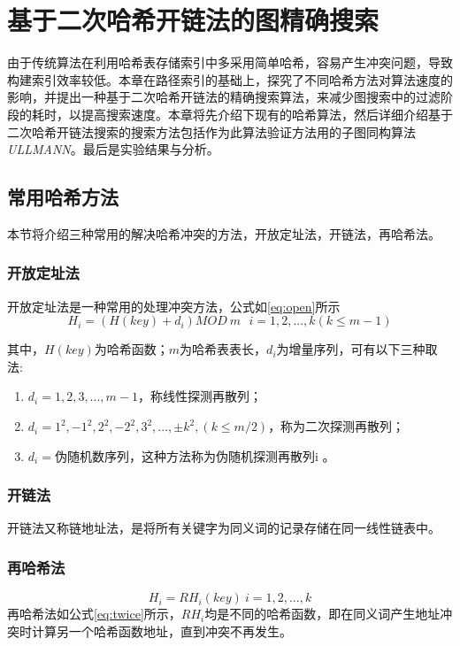 \documentclass{XDBAthesis}
\numberwithin{algorithm}{chapter}
\begin{document}
\else
\fi
\chapter{基于二次哈希开链法的图精确搜索}
\label{chap:graphgrep}
由于传统算法在利用哈希表存储索引中多采用简单哈希，容易产生冲突问题，导致构建索引效率较低。本章在路径索引的基础上，探究了不同哈希方法对算法速度的影响，并提出一种基于二次哈希开链法的精确搜索算法，来减少图搜索中的过滤阶段的耗时，以提高搜索速度。本章将先介绍下现有的哈希算法，然后详细介绍基于二次哈希开链法搜索的搜索方法包括作为此算法验证方法用的子图同构算法\emph{ULLMANN}\cite{ullmann}。最后是实验结果与分析。

\section{常用哈希方法}
本节将介绍三种常用的解决哈希冲突的方法，开放定址法，开链法，再哈希法。

\subsection{开放定址法}
开放定址法\cite{datastruct}是一种常用的处理冲突方法，公式如\eqref{eq:open}所示
\begin{equation}
    H_i =(H(key)+d_i )MOD\ m\ \  \ i=1,2,...,k(k\leq m-1)
    \label{eq:open}
\end{equation}

其中，$H(key)$为哈希函数；$m$为哈希表表长，$d_i $为增量序列，可有以下三种取法:
\begin{enumerate}
    \item $d_i =1,2,3,...,m-1$，称线性探测再散列；
    \item $d_i =1^2 ,-1^2 ,2^2 ,-2^2 ,3^2 ,...,\pm k^2 ,(k\leq m/2 ) $，称为二次探测再散列；
    \item $d_i =$伪随机数序列，这种方法称为伪随机探测再散列\cite{datastruct}i 。
\end{enumerate}
\subsection{开链法}
开链法又称链地址法\cite{datastruct}，是将所有关键字为同义词的记录存储在同一线性链表中。
\subsection{再哈希法}
\begin{equation}
    H_i =RH_i (key)\ i=1,2,...,k
    \label{eq:twice}
\end{equation}
再哈希法\cite{datastruct}如公式\eqref{eq:twice}所示，$RH_i $均是不同的哈希函数，即在同义词产生地址冲突时计算另一个哈希函数地址，直到冲突不再发生。
\end{document}
